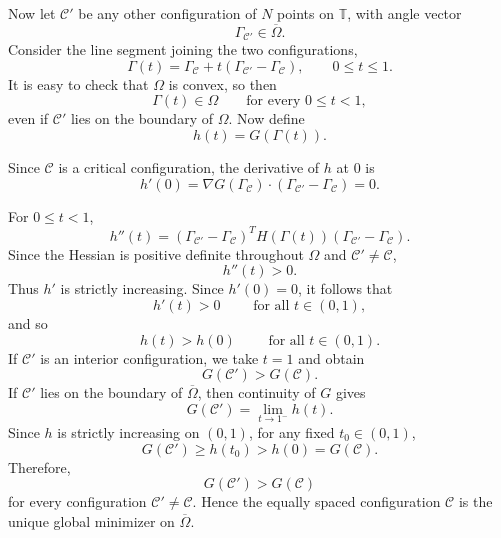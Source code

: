 \documentclass{article}
\begin{document}
Now let $\mathcal{C}'$ be any other configuration of $N$ points on $\mathbb{T}$, with angle vector
\[
\Gamma_{\mathcal C'}\in\overline{\Omega}.
\]
Consider the line segment joining the two configurations,
\[
\Gamma(t)=\Gamma_{\mathcal C}+t(\Gamma_{\mathcal C'}-\Gamma_{\mathcal C}),\qquad0\leq t\leq1.
\]
It is easy to check that $\Omega$ is convex, so then
\[
\Gamma(t)\in\Omega
\qquad
\text{for every }0\leq t<1,
\]
even if $\mathcal{C}'$ lies on the boundary of $\Omega$. Now define
\[
h(t)=G(\Gamma(t)).
\]

Since $\mathcal{C}$ is a critical configuration, the derivative of $h$ at $0$ is
\[
h'(0)=\nabla G(\Gamma_{\mathcal C})\cdot\left(\Gamma_{\mathcal C'}-\Gamma_{\mathcal C}
\right)= 0.
\]

For $0\leq t<1$,
\[
h''(t)
=
\left(
\Gamma_{\mathcal C'}-\Gamma_{\mathcal C}
\right)^T
H(\Gamma(t))
\left(
\Gamma_{\mathcal C'}-\Gamma_{\mathcal C}
\right).
\]
Since the Hessian is positive definite throughout $\Omega$ and $\mathcal{C}'\neq\mathcal{C}$,
\[h''(t)>0.\]
Thus $h'$ is strictly increasing. Since $h'(0)=0$, it follows that
\[
h'(t) >0 \qquad \text{ for all } t\in(0,1),
\]
and so
\[
h(t)>h(0) \qquad \text{ for all } t\in(0,1).
\]
If $\mathcal{C}'$ is an interior configuration, we take $t=1$ and obtain
\[
G(\mathcal{C}')>G(\mathcal{C}).
\]
If $\mathcal{C}'$ lies on the boundary of $\overline{\Omega}$, then continuity of $G$ gives
\[
G(\mathcal{C}')=\lim_{t\to1^-}h(t).
\]
Since $h$ is strictly increasing on $(0,1)$, for any fixed
$t_0\in(0,1)$,
\[
G(\mathcal{C}') \geq h(t_0)>h(0)=G(\mathcal{C}).
\]
Therefore,
\[
G(\mathcal{C}')>G(\mathcal{C})
\]
for every configuration $\mathcal{C}'\neq\mathcal{C}$. Hence the equally spaced configuration $\mathcal{C}$ is the unique global minimizer on $\overline{\Omega}$.

\end{document}
